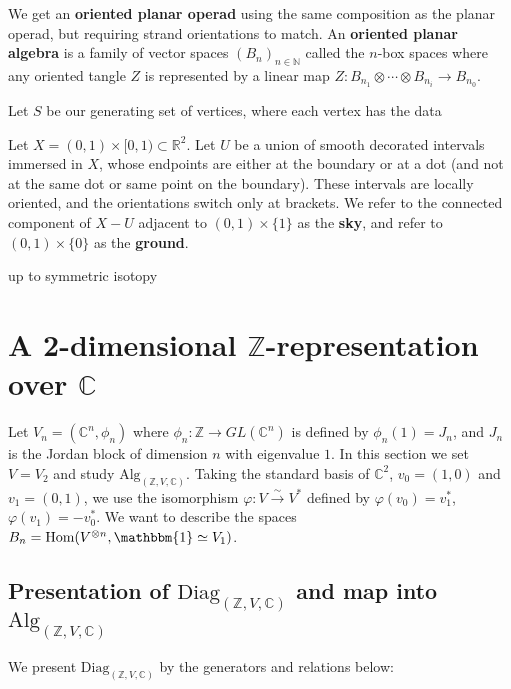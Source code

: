 \documentclass[11pt]{article} %
\begin{document}
We get an \textbf{oriented planar operad} using the same composition as the planar operad, but requiring strand orientations to match. An \textbf{oriented planar algebra} is a family of vector spaces $(B_n)_{n \in \mathbb{N}}$ called the $n$-box spaces where any oriented tangle $Z$ is represented by a linear map $Z:B_{n_1} \otimes \cdots \otimes B_{n_i} \rightarrow B_{n_0}$.
\begin{mydef}
Let $S$ be our generating set of vertices, where each vertex has the data 

Let $X=(0,1) \times [0,1) \subset \mathbb{R}^2$. Let $U$ be a union of smooth decorated intervals immersed in $X$, whose endpoints are either at the boundary or at a dot (and not at the same dot or same point on the boundary). These intervals are locally oriented, and the orientations switch only at brackets. We refer to the connected component of $X-U$ adjacent to $(0,1) \times \{1\}$ as the \textbf{sky}, and refer to $(0,1) \times \{0\}$ as the \textbf{ground}.
\end{mydef}

up to symmetric isotopy

\section{A 2-dimensional $\mathbb{Z}$-representation over $\mathbb{C}$}

Let $V_n=(\mathbb{C}^n,\phi_n)$ where $\phi_n: \mathbb{Z} \rightarrow GL(\mathbb{C}^n)$ is defined by $\phi_n(1)=J_n$, and $J_n$ is the Jordan block of dimension $n$ with eigenvalue $1$. In this section we set $V=V_2$ and study $\text{Alg}_{(\mathbb{Z},V, \mathbb{C})}$. Taking the standard basis of $\mathbb{C}^2$, $v_0 = (1,0)$ and  $v_1 = (0,1)$, we use the isomorphism $\varphi:V \xrightarrow{\sim} V^{\ast}$ defined by $\varphi(v_0)=v_1^{\ast}$, $\varphi(v_1)=-v_0^{\ast}$. We want to describe the spaces $B_n = \text{Hom}(V^{\otimes n},\mathbbm{1} \simeq V_1)$.

\subsection {Presentation of $\text{Diag}_{(\mathbb{Z},V,\mathbb{C})}$ and map into $\text{Alg}_{(\mathbb{Z},V,\mathbb{C})}$}

\begin{mydef}
We present $\text{Diag}_{(\mathbb{Z},V,\mathbb{C})}$ by the generators and relations below:
\end{mydef}
\end{document}
